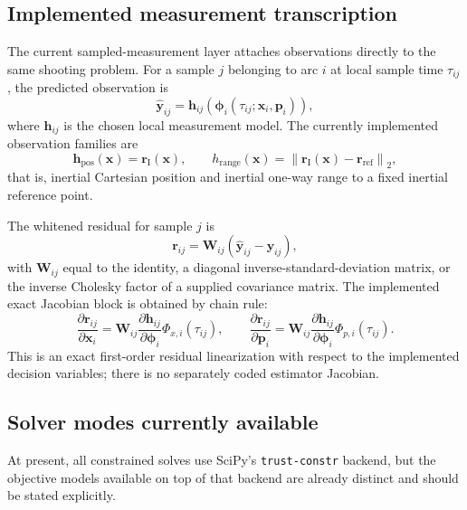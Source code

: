 \documentclass[11pt]{article}
\begin{document}
\subsection{Implemented measurement transcription}

The current sampled-measurement layer attaches observations directly to the
same shooting problem. For a sample $j$ belonging to arc $i$ at local sample
time $\tau_{ij}$, the predicted observation is
\begin{equation}
    \hat{\bm{y}}_{ij}
    =
    \bm{h}_{ij}
    \!\left(
        \bm{\phi}_i(\tau_{ij};\bm{x}_i,\bm{p}_i)
    \right),
\end{equation}
where $\bm{h}_{ij}$ is the chosen local measurement model. The currently
implemented observation families are
\begin{equation}
    \bm{h}_{\mathrm{pos}}(\bm{x}) =
    \bm{r}_{\mathrm{I}}(\bm{x}),
    \qquad
    h_{\mathrm{range}}(\bm{x}) =
    \left\|
        \bm{r}_{\mathrm{I}}(\bm{x}) - \bm{r}_{\mathrm{ref}}
    \right\|_2,
\end{equation}
that is, inertial Cartesian position and inertial one-way range to a fixed
inertial reference point.

The whitened residual for sample $j$ is
\begin{equation}
    \bm{r}_{ij}
    =
    \bm{W}_{ij}
    \left(
        \hat{\bm{y}}_{ij} - \bm{y}_{ij}
    \right),
\end{equation}
with $\bm{W}_{ij}$ equal to the identity, a diagonal inverse-standard-deviation
matrix, or the inverse Cholesky factor of a supplied covariance matrix. The
implemented exact Jacobian block is obtained by chain rule:
\begin{equation}
    \frac{\partial \bm{r}_{ij}}{\partial \bm{x}_i}
    =
    \bm{W}_{ij}
    \frac{\partial \bm{h}_{ij}}{\partial \bm{\phi}_i}
    \Phi_{x,i}(\tau_{ij}),
    \qquad
    \frac{\partial \bm{r}_{ij}}{\partial \bm{p}_i}
    =
    \bm{W}_{ij}
    \frac{\partial \bm{h}_{ij}}{\partial \bm{\phi}_i}
    \Phi_{p,i}(\tau_{ij}).
\end{equation}
This is an exact first-order residual linearization with respect to the
implemented decision variables; there is no separately coded estimator Jacobian.

\subsection{Solver modes currently available}

At present, all constrained solves use SciPy's \texttt{trust-constr} backend,
but the objective models available on top of that backend are already distinct
and should be stated explicitly.
\end{document}
